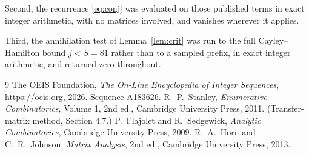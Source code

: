 \documentclass[11pt,a4paper]{article}
\theoremstyle{plain}
\theoremstyle{definition}
\begin{document}
Second, the recurrence \eqref{eq:conj} was evaluated on those published terms in exact
integer arithmetic, with no matrices involved, and vanishes wherever it applies.

Third, the annihilation test of Lemma~\ref{lem:crit} was run to the full Cayley--Hamilton
bound $j<S=81$ rather than to a sampled prefix, in exact integer arithmetic, and returned
zero throughout.

\begin{thebibliography}{9}
 The OEIS Foundation, \emph{The On-Line Encyclopedia of Integer
Sequences}, \url{https://oeis.org}, 2026. Sequence A183626.
 R.~P.~Stanley, \emph{Enumerative Combinatorics}, Volume 1, 2nd ed.,
Cambridge University Press, 2011. (Transfer-matrix method, Section 4.7.)
 P.~Flajolet and R.~Sedgewick, \emph{Analytic Combinatorics}, Cambridge
University Press, 2009.
 R.~A.~Horn and C.~R.~Johnson, \emph{Matrix Analysis}, 2nd ed., Cambridge
University Press, 2013.
\end{thebibliography}
\end{document}
